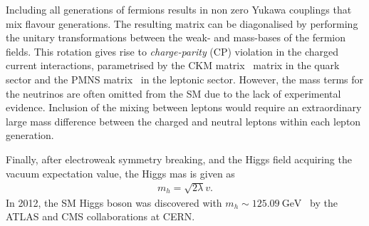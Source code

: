 Including all generations of fermions results in non zero Yukawa couplings that mix flavour generations. The resulting matrix can be diagonalised by performing the unitary transformations between the weak- and mass-bases of the fermion fields. This rotation gives rise to \emph{charge-parity} (CP) violation in the charged current interactions, parametrised by the CKM matrix~\cite{10.1143/PTP.49.652} matrix in the quark sector and the PMNS matrix~\cite{Maki1962} in the leptonic sector. However, the mass terms for the neutrinos are often omitted from the SM due to the lack of experimental evidence. Inclusion of the mixing between leptons would require an extraordinary large mass difference between the charged and neutral leptons within each lepton generation. 

Finally, after electroweak symmetry breaking, and the Higgs field acquiring the vacuum expectation value, the Higgs mas is given as
\begin{equation}
    \label{eq:higgsmass}
    \begin{aligned}
        m_h = \sqrt{2\lambda}v.
     \end{aligned}
\end{equation}
In 2012, the SM Higgs boson was discovered with $m_h \sim \SI{125.09}{\giga\electronvolt}$~\cite{Aad_2012,Chatrchyan2012} by the ATLAS and CMS collaborations at CERN. 

